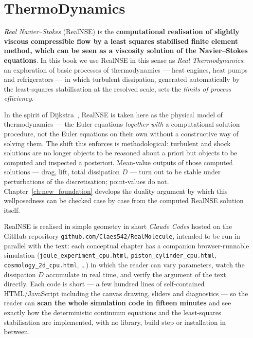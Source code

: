 \section{ThermoDynamics}

\emph{Real Navier--Stokes} (RealNSE) is the \textbf{computational realisation of
slightly viscous compressible flow by a least squares stabilised finite
element method, which can be seen as a viscosity solution of the
Navier--Stokes equations}. In this book we use RealNSE in this sense as
\emph{Real Thermodynamics}: an exploration of basic processes of
thermodynamics --- heat engines, heat pumps and refrigerators --- in which
turbulent dissipation, generated automatically by the least-squares
stabilisation at the resolved scale, sets the \emph{limits of process
efficiency}.

In the spirit of Dijkstra~\cite{dijkstra}, RealNSE is taken here as the
physical model of thermodynamics --- the Euler equations
\emph{together with} a computational solution procedure, not the Euler
equations on their own without a constructive way of solving them.
The shift this enforces is methodological: turbulent and shock
solutions are no longer objects to be reasoned about a priori but
objects to be computed and inspected a posteriori. Mean-value outputs
of those computed solutions --- drag, lift, total dissipation $D$ ---
turn out to be stable under perturbations of the discretisation;
point-values do not. Chapter~\ref{ch:new_foundation} develops the
duality argument by which this wellposedness can be checked case by
case from the computed RealNSE solution itself.

RealNSE is realised in simple geometry in short \emph{Claude Codes} hosted on the
GitHub repository \texttt{github.com/Claes542/RealMolecule}, intended to be
run in parallel with the text: each conceptual chapter has a companion
browser-runnable simulation (\texttt{joule\_experiment\_cpu.html},
\texttt{piston\_cylinder\_cpu.html}, \texttt{cosmology\_2d\_cpu.html}, \ldots)
in which the reader can vary parameters, watch the dissipation $D$ accumulate
in real time, and verify the argument of the text directly. Each code is
short --- a few hundred lines of self-contained HTML/JavaScript including the
canvas drawing, sliders and diagnostics --- so the reader can \textbf{scan
the whole simulation code in fifteen minutes} and see exactly how the
deterministic continuum equations and the least-squares stabilisation are
implemented, with no library, build step or installation in between.


